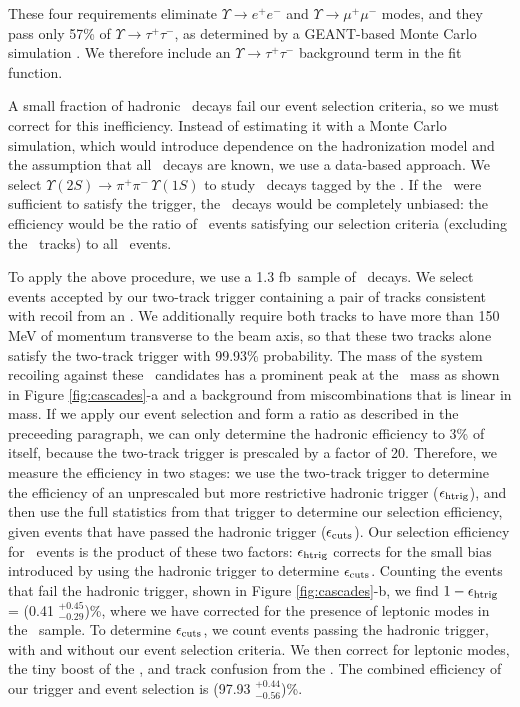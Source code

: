 \documentclass[aps,prl,twocolumn,superscriptaddress,showpacs]{revtex4}
\begin{document}
These four requirements eliminate $\Upsilon \to e^+e^-$ and $\Upsilon
\to \mu^+\mu^-$ modes, and they pass only 57\% of $\Upsilon \to
\tau^+\tau^-$, as determined by a GEANT-based Monte Carlo simulation
\cite{mc}.  We therefore include an $\Upsilon \to \tau^+\tau^-$
background term in the fit function.

A small fraction of hadronic \ups\ decays fail our event selection
criteria, so we must correct for this inefficiency.  Instead of
estimating it with a Monte Carlo simulation, which would introduce
dependence on the hadronization model and the assumption that all
\ups\ decays are known, we use a data-based approach.  We select
$\Upsilon(2S) \to \pi^+\pi^- \, \Upsilon(1S)$ to study \us\ decays
tagged by the \pipi.  If the \pipi\ were sufficient to satisfy the
trigger, the \us\ decays would be completely unbiased: the efficiency
would be the ratio of \us\ events satisfying our selection criteria
(excluding the \pipi\ tracks) to all \us\ events.

To apply the above procedure, we use a 1.3 fb\inv\ sample of \uss\
decays.  We select events accepted by our two-track trigger containing
a pair of tracks consistent with recoil from an \us.  We additionally
require both tracks to have more than 150 MeV of momentum transverse
to the beam axis, so that these two tracks alone satisfy the two-track
trigger with 99.93\% probability.  The mass of the system recoiling
against these \pipi\ candidates has a prominent peak at the \us\ mass
as shown in Figure \ref{fig:cascades}-a and a background from
miscombinations that is linear in mass.  If we apply our event
selection and form a ratio as described in the preceeding paragraph,
we can only determine the hadronic efficiency to 3\% of itself,
because the two-track trigger is prescaled by a factor of 20.
Therefore, we measure the efficiency in two stages: we use the
two-track trigger to determine the efficiency of an unprescaled but
more restrictive hadronic trigger ($\epsilon_{\mbox{\scriptsize htrig}}$), and then use the full
statistics from that trigger to determine our selection efficiency,
given events that have passed the hadronic trigger ($\epsilon_{\mbox{\scriptsize cuts}}$).  Our
selection efficiency for \us\ events is the product of these two
factors: $\epsilon_{\mbox{\scriptsize htrig}}$ corrects for the small bias introduced by using the
hadronic trigger to determine $\epsilon_{\mbox{\scriptsize cuts}}$.  Counting the events that fail
the hadronic trigger, shown in Figure \ref{fig:cascades}-b, we find $1
- \epsilon_{\mbox{\scriptsize htrig}}$ = (0.41 $^{+0.45}_{-0.29}$)\%, where we have corrected for
the presence of leptonic modes in the \us\ sample.  To determine
$\epsilon_{\mbox{\scriptsize cuts}}$, we count events passing the hadronic trigger, with and
without our event selection criteria.  We then correct for leptonic
modes, the tiny boost of the \us, and track confusion from the \pipi.
The combined efficiency of our trigger and event selection is (97.93
$^{+0.44}_{-0.56}$)\%.
\end{document}
